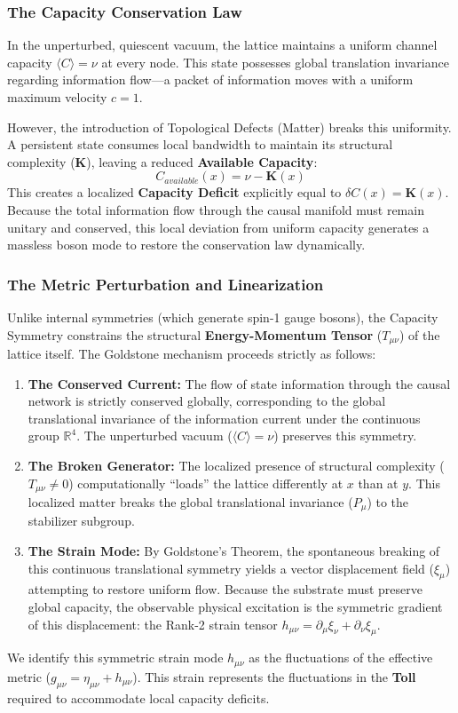 \subsubsection{The Capacity Conservation Law}
In the unperturbed, quiescent vacuum, the lattice maintains a uniform channel capacity $\langle C \rangle = \nu$ at every node. This state possesses global translation invariance regarding information flow---a packet of information moves with a uniform maximum velocity $c = 1$.

However, the introduction of Topological Defects (Matter) breaks this uniformity. A persistent state consumes local bandwidth to maintain its structural complexity ($\mathbf{K}$), leaving a reduced \textbf{Available Capacity}:
\begin{equation}
C_{available}(x) = \nu - \mathbf{K}(x)
\end{equation}
This creates a localized \textbf{Capacity Deficit} explicitly equal to $\delta C(x) = \mathbf{K}(x)$. Because the total information flow through the causal manifold must remain unitary and conserved, this local deviation from uniform capacity generates a massless boson mode to restore the conservation law dynamically.

\subsubsection{The Metric Perturbation and Linearization}
Unlike internal symmetries (which generate spin-1 gauge bosons), the Capacity Symmetry constrains the structural \textbf{Energy-Momentum Tensor} ($T_{\mu\nu}$) of the lattice itself. The Goldstone mechanism proceeds strictly as follows:

\begin{enumerate}
    \item \textbf{The Conserved Current:} The flow of state information through the causal network is strictly conserved globally, corresponding to the global translational invariance of the information current under the continuous group $\mathbb{R}^4$. The unperturbed vacuum ($\langle C \rangle = \nu$) preserves this symmetry.
    \item \textbf{The Broken Generator:} The localized presence of structural complexity ($T_{\mu\nu} \neq 0$) computationally ``loads'' the lattice differently at $x$ than at $y$. This localized matter breaks the global translational invariance ($P_\mu$) to the stabilizer subgroup.
    \item \textbf{The Strain Mode:} By Goldstone's Theorem, the spontaneous breaking of this continuous translational symmetry yields a vector displacement field ($\xi_\mu$) attempting to restore uniform flow. Because the substrate must preserve global capacity, the observable physical excitation is the symmetric gradient of this displacement: the Rank-2 strain tensor $h_{\mu\nu} = \partial_\mu\xi_\nu + \partial_\nu\xi_\mu$.
\end{enumerate}
We identify this symmetric strain mode $h_{\mu\nu}$ as the fluctuations of the effective metric ($g_{\mu\nu} = \eta_{\mu\nu} + h_{\mu\nu}$). This strain represents the fluctuations in the \textbf{Toll} required to accommodate local capacity deficits. 


